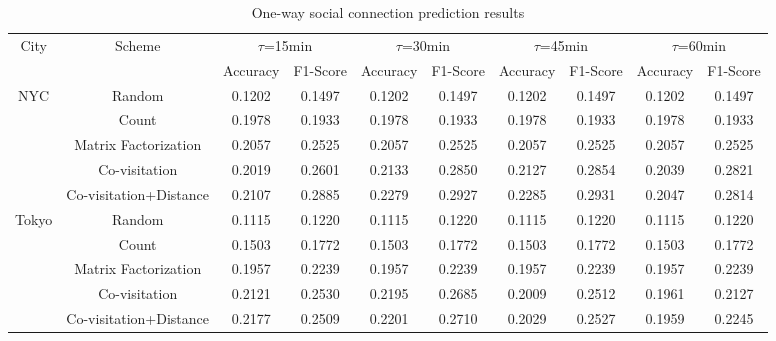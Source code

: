 \begin{table*}[]
\centering
\caption{One-way social connection prediction results}
\label{T2}
\begin{tabular}{|c|c|c|c|c|c|c|c|c|c|}
\hline
\multirow{2}{*}{City}  & \multirow{2}{*}{Scheme} & \multicolumn{2}{c|}{$\tau$=15min} & \multicolumn{2}{c|}{$\tau$=30min} & \multicolumn{2}{c|}{$\tau$=45min} & \multicolumn{2}{c|}{$\tau$=60min} \\ \cline{3-10} 
                       &                         & Accuracy      & F1-Score     & Accuracy      & F1-Score     & Accuracy      & F1-Score     & Accuracy      & F1-Score     \\ \hline
\multirow{5}{*}{NYC}   & Random                  & 0.1202        & 0.1497       & 0.1202        & 0.1497       & 0.1202        & 0.1497       & 0.1202        & 0.1497       \\ \cline{2-10} 
                       & Count                   & 0.1978        & 0.1933       & 0.1978        & 0.1933       & 0.1978        & 0.1933       & 0.1978        & 0.1933       \\ \cline{2-10} 
                       & Matrix Factorization    & 0.2057        & 0.2525       & 0.2057        & 0.2525       & 0.2057        & 0.2525       & 0.2057        & 0.2525       \\ \cline{2-10} 
                       & Co-visitation           & 0.2019        & 0.2601       & 0.2133        & 0.2850       & 0.2127        & 0.2854       & 0.2039        & 0.2821       \\ \cline{2-10} 
                       & Co-visitation+Distance  & 0.2107        & 0.2885       & 0.2279        & 0.2927       & 0.2285        & 0.2931       & 0.2047        & 0.2814       \\ \hline
\multirow{5}{*}{Tokyo} & Random                  & 0.1115        & 0.1220       & 0.1115        & 0.1220       & 0.1115        & 0.1220       & 0.1115        & 0.1220       \\ \cline{2-10} 
                       & Count                   & 0.1503        & 0.1772       & 0.1503        & 0.1772       & 0.1503        & 0.1772       & 0.1503        & 0.1772       \\ \cline{2-10} 
                       & Matrix Factorization    & 0.1957        & 0.2239       & 0.1957        & 0.2239       & 0.1957        & 0.2239       & 0.1957        & 0.2239       \\ \cline{2-10} 
                       & Co-visitation           & 0.2121        & 0.2530       & 0.2195        & 0.2685       & 0.2009        & 0.2512       & 0.1961        & 0.2127       \\ \cline{2-10} 
                       & Co-visitation+Distance  & 0.2177        & 0.2509       & 0.2201        & 0.2710       & 0.2029        & 0.2527       & 0.1959        & 0.2245       \\ \hline
\end{tabular}
\end{table*}




